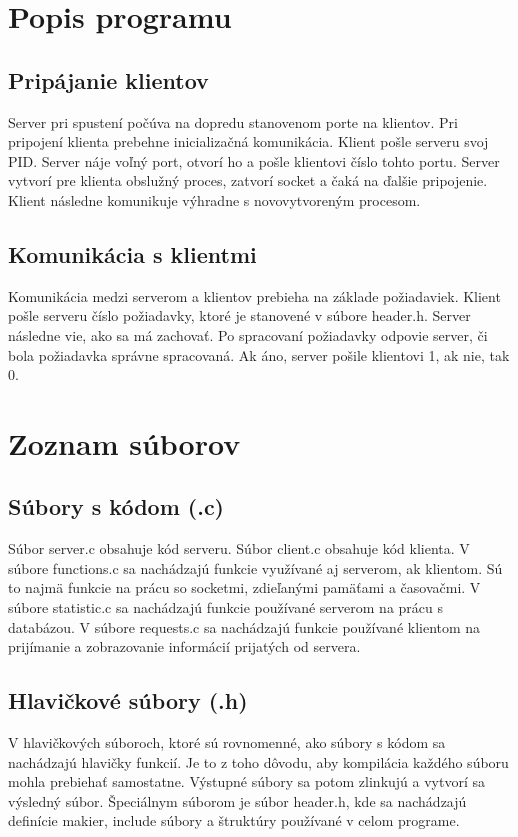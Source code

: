 \documentclass{article}
\begin{document}
\section{Popis programu}
\subsection{Pripájanie klientov}
Server pri spustení počúva na dopredu stanovenom porte na klientov. Pri pripojení klienta prebehne inicializačná komunikácia. Klient pošle serveru svoj PID. Server náje voľný port, otvorí ho a pošle klientovi číslo tohto portu. Server vytvorí pre klienta obslužný proces, zatvorí socket a čaká na ďalšie pripojenie. Klient následne komunikuje výhradne s novovytvoreným procesom.

\subsection{Komunikácia s klientmi}
Komunikácia medzi serverom a klientov prebieha na základe požiadaviek. Klient pošle serveru číslo požiadavky, ktoré je stanovené v súbore header.h. Server následne vie, ako sa má zachovať. Po spracovaní požiadavky odpovie server, či bola požiadavka správne spracovaná. Ak áno, server pošile klientovi 1, ak nie, tak 0.

\section{Zoznam súborov}
\subsection{Súbory s kódom (.c)}
Súbor server.c obsahuje kód serveru. Súbor client.c obsahuje kód klienta.
\newline
V súbore functions.c sa nachádzajú funkcie využívané aj serverom, ak klientom. Sú to najmä funkcie na prácu so socketmi, zdieľanými pamäťami a časovačmi.
\newline
V súbore statistic.c sa nachádzajú funkcie používané serverom na prácu s databázou. 
\newline
V súbore requests.c sa nachádzajú funkcie používané klientom na prijímanie a zobrazovanie informácií prijatých od servera.
\subsection{Hlavičkové súbory (.h)}
V hlavičkových súboroch, ktoré sú rovnomenné, ako súbory s kódom sa nachádzajú hlavičky funkcií. Je to z toho dôvodu, aby kompilácia každého súboru mohla prebiehať samostatne. Výstupné súbory sa potom zlinkujú a vytvorí sa výsledný súbor. 
\newline
Špeciálnym súborom je súbor header.h, kde sa nachádzajú definície makier, include súbory a štruktúry používané v celom programe.
\end{document}
